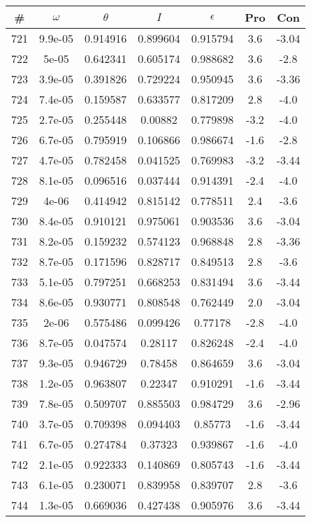 \begin{table}
\begin{tabular}{c|c|c|c|c|c|c}
\# & $\omega$ & $\theta$ & $I$ & $\epsilon$ & Pro & Con\\
\hline
721 & 9.9e-05 & 0.914916 & 0.899604 & 0.915794 & 3.6 & -3.04\\
722 & 5e-05 & 0.642341 & 0.605174 & 0.988682 & 3.6 & -2.8\\
723 & 3.9e-05 & 0.391826 & 0.729224 & 0.950945 & 3.6 & -3.36\\
724 & 7.4e-05 & 0.159587 & 0.633577 & 0.817209 & 2.8 & -4.0\\
725 & 2.7e-05 & 0.255448 & 0.00882 & 0.779898 & -3.2 & -4.0\\
726 & 6.7e-05 & 0.795919 & 0.106866 & 0.986674 & -1.6 & -2.8\\
727 & 4.7e-05 & 0.782458 & 0.041525 & 0.769983 & -3.2 & -3.44\\
728 & 8.1e-05 & 0.096516 & 0.037444 & 0.914391 & -2.4 & -4.0\\
729 & 4e-06 & 0.414942 & 0.815142 & 0.778511 & 2.4 & -3.6\\
730 & 8.4e-05 & 0.910121 & 0.975061 & 0.903536 & 3.6 & -3.04\\
731 & 8.2e-05 & 0.159232 & 0.574123 & 0.968848 & 2.8 & -3.36\\
732 & 8.7e-05 & 0.171596 & 0.828717 & 0.849513 & 2.8 & -3.6\\
733 & 5.1e-05 & 0.797251 & 0.668253 & 0.831494 & 3.6 & -3.44\\
734 & 8.6e-05 & 0.930771 & 0.808548 & 0.762449 & 2.0 & -3.04\\
735 & 2e-06 & 0.575486 & 0.099426 & 0.77178 & -2.8 & -4.0\\
736 & 8.7e-05 & 0.047574 & 0.28117 & 0.826248 & -2.4 & -4.0\\
737 & 9.3e-05 & 0.946729 & 0.78458 & 0.864659 & 3.6 & -3.04\\
738 & 1.2e-05 & 0.963807 & 0.22347 & 0.910291 & -1.6 & -3.44\\
739 & 7.8e-05 & 0.509707 & 0.885503 & 0.984729 & 3.6 & -2.96\\
740 & 3.7e-05 & 0.709398 & 0.094403 & 0.85773 & -1.6 & -3.44\\
741 & 6.7e-05 & 0.274784 & 0.37323 & 0.939867 & -1.6 & -4.0\\
742 & 2.1e-05 & 0.922333 & 0.140869 & 0.805743 & -1.6 & -3.44\\
743 & 6.1e-05 & 0.230071 & 0.839958 & 0.839707 & 2.8 & -3.6\\
744 & 1.3e-05 & 0.669036 & 0.427438 & 0.905976 & 3.6 & -3.44\\

\end{tabular}
\end{table}
